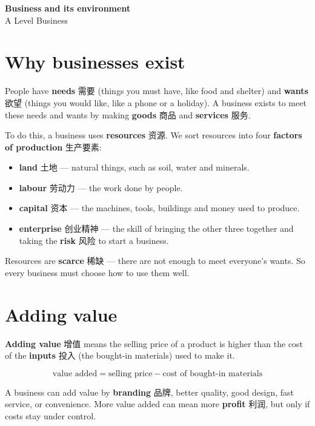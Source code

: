 \documentclass[11pt]{article}
\begin{document}
\begin{center}
  {\LARGE\bfseries Business and its environment}\\[0.35em]
  {\large A Level Business}
\end{center}
\vspace{0.6em}

\section*{Why businesses exist}

People have \textbf{needs} 需要 (things you must have, like food and shelter) and \textbf{wants} 欲望 (things you would like, like a phone or a holiday). A business exists to meet these needs and wants by making \textbf{goods} 商品 and \textbf{services} 服务.

To do this, a business uses \textbf{resources} 资源. We sort resources into four \textbf{factors of production} 生产要素:

\begin{itemize}
\item \textbf{land} 土地 — natural things, such as soil, water and minerals.

\item \textbf{labour} 劳动力 — the work done by people.

\item \textbf{capital} 资本 — the machines, tools, buildings and money used to produce.

\item \textbf{enterprise} 创业精神 — the skill of bringing the other three together and taking the \textbf{risk} 风险 to start a business.

\end{itemize}

Resources are \textbf{scarce} 稀缺 — there are not enough to meet everyone's wants. So every business must choose how to use them well.

\section*{Adding value}

\textbf{Adding value} 增值 means the selling price of a product is higher than the cost of the \textbf{inputs} 投入 (the bought-in materials) used to make it.

\[
\text{value added} = \text{selling price} - \text{cost of bought-in materials}
\]

A business can add value by \textbf{branding} 品牌, better quality, good design, fast service, or convenience. More value added can mean more \textbf{profit} 利润, but only if costs stay under control.
\end{document}
